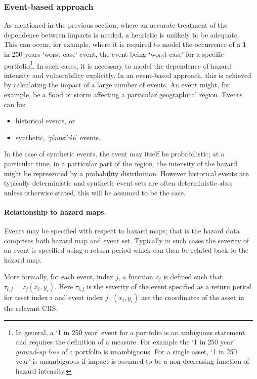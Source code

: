 \documentclass[a4paper,11pt]{extarticle} %
\theoremstyle{definition}
\begin{document}
\subsubsection{Event-based approach}
\label{Sec:EventBased}
As mentioned in the previous section, where an accurate treatment of the dependence between impacts is needed, a heuristic is unlikely to be adequate. This can occur, for example, where it is required to model the occurrence of a 1 in 250 years `worst-case' event, the event being `worst-case' for a specific portfolio\footnote{In general, a `1 in 250 year' event for a portfolio is an ambiguous statement and requires the definition of a measure. For example the `1 in 250 year' \emph{ground-up loss} of a portfolio is unambiguous. For a single asset, `1 in 250 year' is unambiguous if impact is assumed to be a non-decreasing function of hazard intensity.}. In such cases, it is necessary to model the dependence of hazard intensity and vulnerability explicitly. In an event-based approach, this is achieved by calculating the impact of a large number of events. An event might, for example, be a flood or storm affecting a particular geographical region. Events can be:

\begin{itemize}
    \item historical events, or
    \item synthetic, `plausible' events.
\end{itemize}

In the case of synthetic events, the event may itself be probabilistic; at a particular time, in a particular part of the region, the intensity of the hazard might be represented by a probability distribution. However historical events are typically deterministic and synthetic event sets are often deterministic also; unless otherwise stated, this will be assumed to be the case.

\paragraph{Relationship to hazard maps.}
Events may be specified with respect to hazard maps; that is the hazard data comprises both hazard map and event set. Typically in such cases the severity of an event is specified using a return period which can then be related back to the hazard map.

More formally, for each event, index $j$, a function $z_j$ is defined such that $\tau_{i, j} = z_j(x_i, y_i)$. Here $\tau_{i, j}$ is the severity of the event specified as a return period for asset index $i$ and event index $j$.  $(x_i, y_i)$ are the coordinates of the asset in the relevant CRS.
\end{document}
